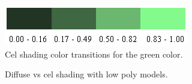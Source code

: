 \documentclass{article}
\begin{document}


\vspace{-1.5em}

\begin{figure}[h]
    \centering
    \includegraphics[width=.8\columnwidth]{imgs/celshading_levels.png}
    \caption{Cel shading color transitions for the green color.}
    \label{fig:celshading_levels}
\end{figure}

\vspace{-1.5em}

\begin{figure}[h]
    \centering
    \hspace{1em}
    \caption{Diffuse vs cel shading with low poly models.}
    \label{fig:celshading_result}
\end{figure}
\end{document}
